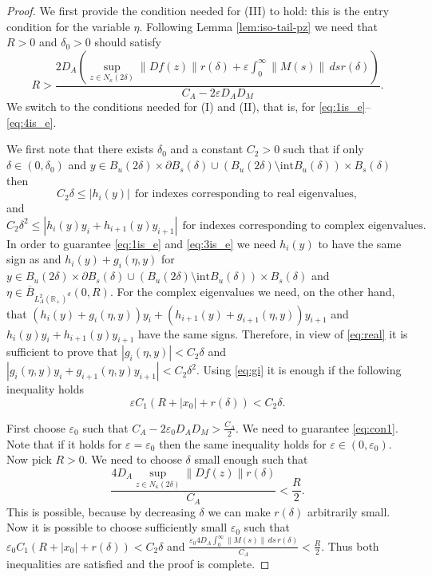 \documentclass[11pt, leqno]{amsart}
\theoremstyle{definition}
\begin{document}
\begin{proof}
	We first provide the condition needed for  (III) to hold: this is the entry condition for the variable $\eta$. Following Lemma \ref{lem:iso-tail-pz} we need that $R>0$ and $\delta_0>0$ should satisfy
			\begin{equation}\label{eq:con1}
	R > \frac{2 D_A  \left(\sup_{z\in N_\kappa(2\delta)}\|D f(z)\|r(\delta) +  \varepsilon  \int_0^\infty\|M(s)\|\,  ds  r(\delta)  \right) }{C_A-2\varepsilon D_AD_M}.
	\end{equation}
	We switch to the conditions needed for (I) and (II), that is, for \eqref{eq:1is_e}--\eqref{eq:4is_e}.
	
	
	We first note  that there exists $\delta_0$ and a constant $C_2 > 0$ such that if only $\delta\in (0,\delta_0)$ and $y\in  B_u(2\delta)\times \partial B_s(\delta) \cup (B_u(2\delta)\setminus \textrm{int} B_u(\delta)) \times B_s(\delta)$ then
	\begin{equation}\label{eq:real}
	C_2 \delta \leq |h_i(y)|\ \ \textrm{for indexes corresponding to real eigenvalues},
	\end{equation}
	and
	\begin{equation}\label{eq:complex}
	C_2 \delta^2 \leq |h_i(y)y_i + h_{i+1}(y)y_{i+1}|\ \ \textrm{for indexes corresponding to complex eigenvalues}.
	\end{equation}
	In order to guarantee \eqref{eq:1is_e} and \eqref{eq:3is_e} we need $h_i(y)$ to have the same sign as and $h_i(y)+g_i(\eta,y)$ for $y\in  B_u(2\delta)\times \partial B_s(\delta) \cup (B_u(2\delta)\setminus \textrm{int} B_u(\delta)) \times B_s(\delta)$ and $\eta\in \overline{B}_{L^2_A(\mathbb{R}_+)^d}(0,R)$.
	For the complex eigenvalues we need, on the other hand,
	that $(h_i(y)+g_i(\eta,y)) y_i + (h_{i+1}(y)+g_{i+1}(\eta,y))y_{i+1}$ and $h_i(y)y_i + h_{i+1}(y)y_{i+1}$ have the same signs. Therefore, in view of
	 \eqref{eq:real} it is sufficient to prove that $|g_i(\eta,y)| < C_2 \delta$ and $|g_i(\eta,y)y_i+g_{i+1}(\eta,y)y_{i+1}| < C_2\delta^2$. Using \eqref{eq:gi} it is enough if the following inequality holds
	 \begin{equation}\label{eq:con2}
	 \varepsilon C_1(R+|x_0|+r(\delta)) < C_2\delta.
	 \end{equation}

First choose $\varepsilon_0$ such that $C_A-2\varepsilon_0 D_AD_M > \frac{C_A}{2}$. We need to guarantee \eqref{eq:con1}. Note that if it holds for $\varepsilon=\varepsilon_0$ then the same inequality holds for $\varepsilon \in (0,\varepsilon_0)$.
Now pick $R>0$. We need to choose $\delta$ small enough such that
$$\frac{4 D_A  \sup_{z\in N_\kappa(2\delta)}\|D f(z)\|r(\delta) }{C_A} < \frac{R}{2}.
$$ This is possible, because by decreasing $\delta$ we can make $r(\delta)$ arbitrarily small. Now it is possible to choose sufficiently small $\varepsilon_0$ such that $\varepsilon_0 C_1 (R+|x_0|+r(\delta)) < C_2\delta$ and $\frac{\varepsilon_0 4D_A \int_0^\infty\|M(s)\|\, ds\, r(\delta)}{C_A} < \frac{R}{2}$. Thus both inequalities are satisfied and the proof is complete.
\end{proof}
\end{document}
